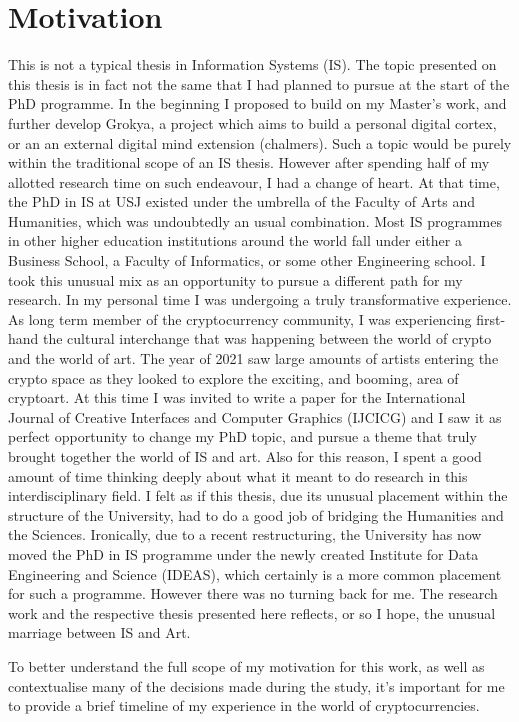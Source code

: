 \section{Motivation}

This is not a typical thesis in Information Systems (IS). The topic presented on this thesis is in fact not the same that I had planned to pursue at the start of the PhD programme.  In the beginning I proposed to build on my Master's work, and further develop Grokya, a project which aims to build a personal digital cortex, or an an external digital mind extension (chalmers). Such a topic would be purely within the traditional scope of an IS thesis. However after spending half of my allotted research time on such endeavour, I had a change of heart. At that time, the PhD in IS at USJ existed under the umbrella of the Faculty of Arts and Humanities, which was undoubtedly an usual combination. Most IS programmes in other higher education institutions around the world fall under either a Business School, a Faculty of Informatics, or some other Engineering school. I took this unusual mix as an opportunity to pursue a different path for my research. In my personal time I was undergoing a truly transformative experience. As long term member of the cryptocurrency community, I was experiencing first-hand the cultural interchange that was happening between the world of crypto and the world of art. The year of 2021 saw large amounts of artists entering the crypto space as they looked to explore the exciting, and booming, area of cryptoart. At this time I was invited to write a paper for the International Journal of Creative Interfaces and Computer Graphics (IJCICG) and I saw it as perfect opportunity to change my PhD topic, and pursue a theme that truly brought together the world of IS and art. Also for this reason, I spent a good amount of time thinking deeply about what it meant to do research in this interdisciplinary field. I felt as if this thesis, due its unusual placement within the structure of the University, had to do a good job of bridging the Humanities and the Sciences. Ironically, due to a recent restructuring, the University has now moved the PhD in IS programme under the newly created Institute for Data Engineering and Science (IDEAS), which certainly is a more common placement for such a programme. However there was no turning back for me. The research work and the respective thesis presented here reflects, or so I hope, the unusual marriage between IS and Art.

To better understand the full scope of my motivation for this work, as well as contextualise many of the decisions made during the study, it's important for me to provide a brief timeline of my experience in the world of cryptocurrencies.


